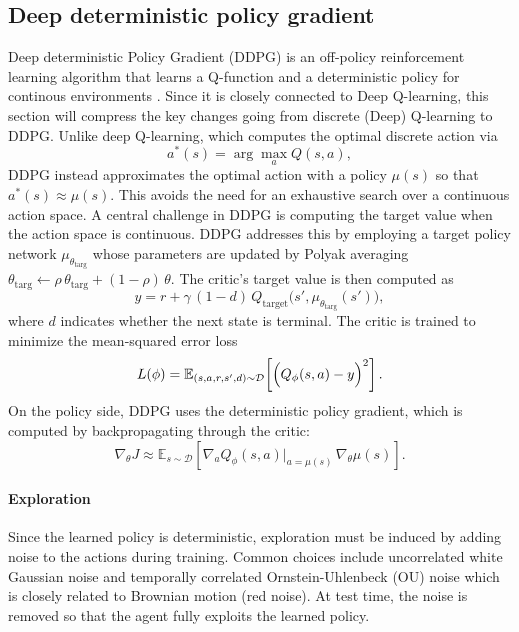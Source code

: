 \subsection{Deep deterministic policy gradient}
Deep deterministic Policy Gradient (DDPG) is an off-policy reinforcement learning algorithm that learns a Q-function and a deterministic policy for continous environments \cite{ddpg_original}. Since it is closely connected to Deep Q-learning, this section will compress the key changes going from discrete (Deep) Q-learning to DDPG. Unlike deep Q-learning, which computes the optimal discrete action via
\[
a^*(s) = \arg\max_a Q(s,a),
\]
DDPG instead approximates the optimal action with a policy \(\mu(s)\) so that \(a^*(s) \approx \mu(s)\). This avoids the need for an exhaustive search over a continuous action space. A central challenge in DDPG is computing the target value when the action space is continuous. DDPG addresses this by employing a target policy network \(\mu_{\theta_{\text{targ}}}\) whose parameters are updated by Polyak averaging $\theta_{\text{targ}} \leftarrow \rho\,\theta_{\text{targ}} + (1-\rho)\,\theta.$
The critic’s target value is then computed as
\[
y = r + \gamma\,(1-d)\,Q_{\text{target}}\bigl(s',\mu_{\theta_{\text{targ}}}(s')\bigr),
\]
where \(d\) indicates whether the next state is terminal. The critic is trained to minimize the mean-squared error loss
\[
L(\phi) = \mathbb{E}_{(s,a,r,s',d)\sim\mathcal{D}}\!\left[\Bigl(Q_\phi(s,a) - y\Bigr)^2\right].
\]
On the policy side, DDPG uses the deterministic policy gradient, which is computed by backpropagating through the critic:
\[
\nabla_{\theta} J \approx \mathbb{E}_{s\sim\mathcal{D}}\!\left[\nabla_a Q_\phi(s,a)\Big|_{a=\mu(s)}\,\nabla_{\theta}\mu(s)\right].
\]

\paragraph{Exploration}
Since the learned policy is deterministic, exploration must be induced by adding noise to the actions during training. Common choices include uncorrelated white Gaussian noise and temporally correlated Ornstein-Uhlenbeck (OU) noise which is closely related to Brownian motion (red noise). At test time, the noise is removed so that the agent fully exploits the learned policy.


